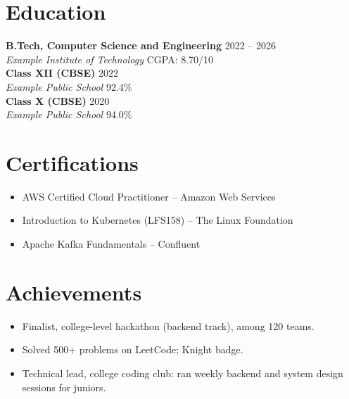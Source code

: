 \documentclass[10pt,a4paper]{article}
\begin{document}
\section*{Education}
\textbf{B.Tech, Computer Science and Engineering} \hfill 2022 -- 2026 \\
\textit{Example Institute of Technology} \hfill CGPA: 8.70/10 \\[2pt]
\textbf{Class XII (CBSE)} \hfill 2022 \\
\textit{Example Public School} \hfill 92.4\% \\[2pt]
\textbf{Class X (CBSE)} \hfill 2020 \\
\textit{Example Public School} \hfill 94.0\%

\section*{Certifications}
\begin{itemize}
    \item AWS Certified Cloud Practitioner -- Amazon Web Services
    \item Introduction to Kubernetes (LFS158) -- The Linux Foundation
    \item Apache Kafka Fundamentals -- Confluent
\end{itemize}

\section*{Achievements}
\begin{itemize}
    \item Finalist, college-level hackathon (backend track), among 120 teams.
    \item Solved 500+ problems on LeetCode; Knight badge.
    \item Technical lead, college coding club: ran weekly backend and system design sessions for juniors.
\end{itemize}
\end{document}
